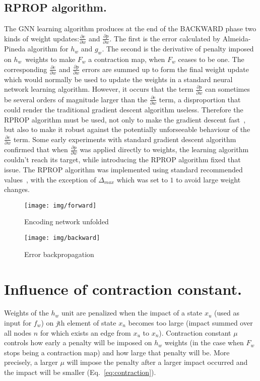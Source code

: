 \documentclass[a4paper, 11pt, twocolumn]{spie}  %
\begin{document}
\subsection{RPROP algorithm.}
The GNN learning algorithm produces at the end of the BACKWARD phase two kinds of weight updates:$\frac{\partial e}{\partial w}$ and $\frac{\partial p}{\partial w}$. The first is the error calculated by Almeida-Pineda algorithm for $h_w$ and $g_w$. The second is the derivative of penalty imposed on $h_w$~weights to make $F_w$ a contraction map, when $F_w$ ceases to be one. The corresponding $\frac{\partial e}{\partial w}$ and $\frac{\partial p}{\partial w}$ errors are summed up to form the final weight update which would normally be used to update the weights in a standard neural network learning algorithm. However, it occurs that the term $\frac{\partial p}{\partial w}$ can sometimes be several orders of magnitude larger than the $\frac{\partial e}{\partial w}$ term, a disproportion that could render the traditional gradient descent algorithm useless. Therefore the RPROP algorithm must be used, not only to make the gradient descent fast~\cite{scarselli2009graph}, but also to make it robust against the potentially unforseeable behaviour of the  $\frac{\partial e}{\partial w}$ term. Some early experiments with standard gradient descent algorithm confirmed that when $\frac{\partial p}{\partial w}$ was applied directly to weights, the learning algorithm couldn't reach its target, while introducing the RPROP algorithm fixed that issue. The RPROP algorithm was implemented using standard recommended values~\cite{riedmiller1993direct}, with the exception of $\Delta_{max}$ which was set to $1$ to avoid large weight changes.

\begin{figure}
\begin{center}
	\texttt{[image: img/forward]}
	\caption{Encoding network unfolded}
	\label{fig:forward}
\end{center}
\end{figure}


\begin{figure}
\begin{center}
	\texttt{[image: img/backward]}
	\caption{Error backpropagation}
	\label{fig:backward}
\end{center}
\end{figure}

\newpage
\section{Influence of contraction constant.}
Weights of the $h_w$ unit are penalized when the impact of a state $x_u$ (used as input for $f_w$) on \emph{j}th element of state $x_n$ becomes too large (impact summed over all nodes $n$ for which exists an edge from $x_u$ to $x_n$). Contraction constant $\mu$ controls how early a penalty will be imposed on $h_w$ weights (in the case when $F_w$ stops being a contraction map) and how large that penalty will be. More precisely, a larger $\mu$ will impose the penalty after a larger impact occurred and the impact will be smaller (Eq.~\ref{eq:contraction}).
\end{document}
